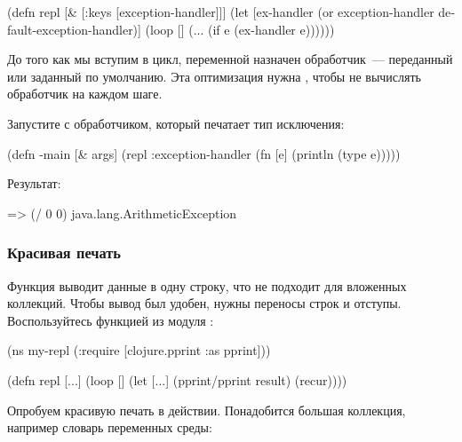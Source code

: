 \begin{english}
  \begin{clojure}
(defn repl [& [{:keys [exception-handler]}]]
  (let [ex-handler
        (or exception-handler
            default-exception-handler)]
    (loop []
      (...
        (if e
          (ex-handler e))))))
  \end{clojure}
\end{english}

До того как мы вступим в цикл, переменной  назначен обработчик~--- переданный или заданный по умолчанию. Эта оптимизация нужна , чтобы не вычислять обработчик на каждом шаге.

Запустите  с обработчиком, который печатает тип исключения:

\begin{english}
  \begin{clojure}
(defn -main [& args]
  (repl {:exception-handler
         (fn [e] (println (type e)))}))
  \end{clojure}
\end{english}

Результат:

\begin{english}
  \begin{clojure}
=> (/ 0 0)
java.lang.ArithmeticException
  \end{clojure}
\end{english}

\subsubsection{Красивая печать}

Функция  выводит данные в одну строку, что не подходит для вложенных коллекций. Чтобы вывод был удобен, нужны переносы строк и отступы. Воспользуйтесь функцией  из модуля :

\begin{english}
  \begin{clojure}
(ns my-repl
  (:require
   [clojure.pprint :as pprint]))

(defn repl [...]
  (loop []
    (let [...]
      (pprint/pprint result)
      (recur))))
  \end{clojure}
\end{english}

Опробуем красивую печать в действии. Понадобится большая коллекция, например словарь переменных среды:

